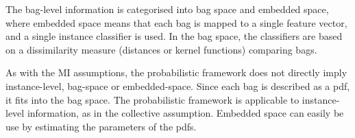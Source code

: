 The bag-level information is categorised into bag space and embedded space, where embedded space means that each bag is mapped to a single feature vector, and a single instance classifier is used. 
In the bag space, the classifiers are based on a dissimilarity measure (distances or kernel functions) comparing bags.

As with the MI assumptions, the probabilistic framework does not directly imply instance-level, bag-space or embedded-space. 
Since each bag is described as a pdf, it fits into the bag space. 
The probabilistic framework is applicable to instance-level information, as in the collective assumption. 
Embedded space can easily be use by estimating the parameters of the pdfs. 
